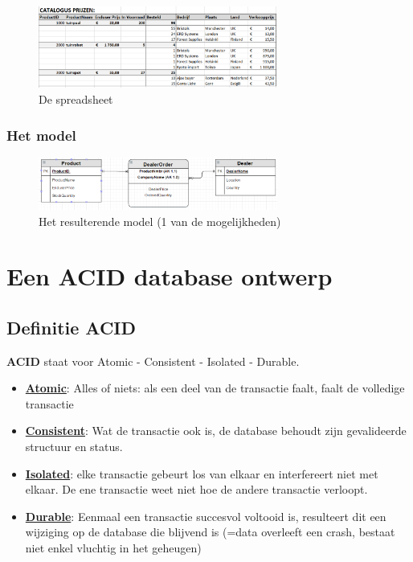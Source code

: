 \documentclass{article}
\newcommand{\bold}[1]{\textbf{#1}}
\begin{document}
\begin{figure}[H]
    \centering
    \includegraphics[width=0.7\textwidth]{model2.png}
    \caption{De spreadsheet}
\end{figure}

\subsubsection{Het model}

\begin{figure}[H]
    \centering
    \includegraphics[width=0.7\textwidth]{model2-model.png}
    \caption{Het resulterende model (1 van de mogelijkheden)}
\end{figure}


\section{Een ACID database ontwerp}

\subsection{Definitie ACID}

\bold{ACID} staat voor Atomic - Consistent - Isolated - Durable.

\begin{itemize}
    \item \underline{\bold{Atomic}}: Alles of niets: als een deel van de transactie faalt, faalt de volledige transactie
    \item \underline{\bold{Consistent}}: Wat de transactie ook is, de database behoudt zijn gevalideerde structuur en status.
    \item \underline{\bold{Isolated}}: elke transactie gebeurt los van elkaar en interfereert niet met elkaar. De ene transactie weet niet hoe de andere transactie verloopt.
    \item \underline{\bold{Durable}}: Eenmaal een transactie succesvol voltooid is, resulteert dit een wijziging op de database die blijvend is (=data overleeft een crash, bestaat niet enkel vluchtig in het geheugen)
\end{itemize}
\end{document}
